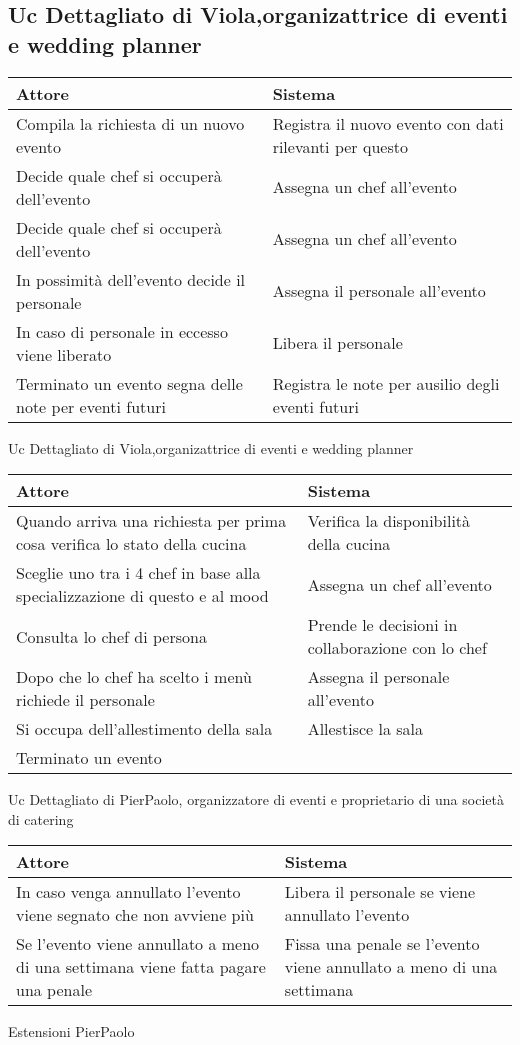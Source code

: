 \subsection{Uc Dettagliato di Viola,organizattrice di eventi e wedding planner}

\begin{tabular}{|p{5cm}|p{5cm}|}
  \hline
  Attore & Sistema \\
  \hline
  Compila la richiesta di un nuovo evento & Registra il nuovo evento con dati rilevanti per questo \\
  \hline
  Decide quale chef si occuperà dell'evento & Assegna un chef all'evento \\ 
  \hline
  Decide quale chef si occuperà dell'evento & Assegna un chef all'evento \\
  \hline
  In possimità dell'evento decide il personale & Assegna il personale all'evento \\
  \hline
  In caso di personale in eccesso viene liberato & Libera il personale \\
  \hline
  Terminato un evento segna delle note per eventi futuri & Registra le note per ausilio degli eventi futuri\\
  \hline
\end{tabular}
\newline
\caption{Uc Dettagliato di Viola,organizattrice di eventi e wedding planner}
\newline
\begin{tabular}{|p{5cm}|p{5cm}|}
  \hline
  Attore & Sistema \\
  \hline
  Quando arriva una richiesta per prima cosa verifica lo stato della cucina & Verifica la disponibilità della cucina \\
  \hline
  Sceglie uno tra i 4 chef in base alla specializzazione di questo e al mood& Assegna un chef all'evento \\
  \hline
  Consulta lo chef di persona & Prende le decisioni in collaborazione con lo chef \\
  \hline
  Dopo che lo chef ha scelto i menù richiede il personale & Assegna il personale all'evento \\
  \hline
  Si occupa dell'allestimento della sala & Allestisce la sala \\
  \hline
  Terminato un evento 
\end{tabular}
\newline
\caption{Uc Dettagliato di PierPaolo, organizzatore di eventi e proprietario di una società di catering}
\newpage
 \begin{tabular}{|p{5cm}|p{5cm}|}
  \hline 
  Attore & Sistema \\
  \hline
  In caso venga annullato l'evento viene segnato che non avviene più & Libera il personale se viene annullato l'evento \\
  \hline
  Se l'evento viene annullato a meno di una settimana viene fatta pagare una penale & Fissa una penale se l'evento viene annullato a meno di una settimana \\
 \end{tabular}
 \newline
\caption{Estensioni PierPaolo}